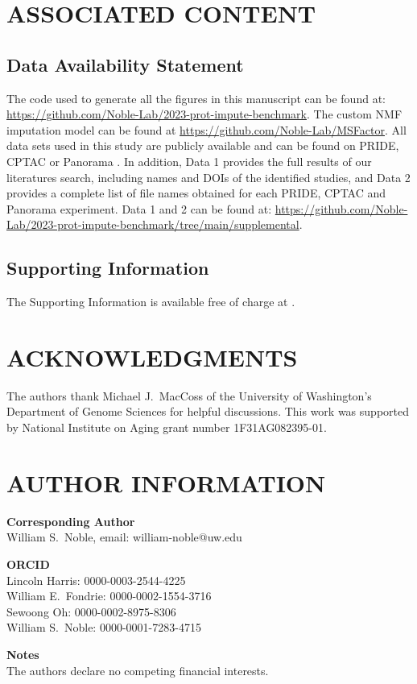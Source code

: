 \documentclass{article}
\newcommand{\fixme}[1]{{\color{red}{#1}}}
\begin{document}
\section*{ASSOCIATED CONTENT}
\subsection*{Data Availability Statement}
The code used to generate all the figures in this manuscript can be found at:
\url{https://github.com/Noble-Lab/2023-prot-impute-benchmark}. The custom NMF imputation model can be found at \url{https://github.com/Noble-Lab/MSFactor}. All data sets used in this study are publicly available and can be found on PRIDE, CPTAC or Panorama \cite{PRIDE, CPTAC, panorama-public}. In addition, Data 1 provides the full results of our literatures search, including names and DOIs of the identified studies, and Data 2 provides a complete list of file names obtained for each PRIDE, CPTAC and Panorama experiment. Data 1 and 2 can be found at:
\url{https://github.com/Noble-Lab/2023-prot-impute-benchmark/tree/main/supplemental}.

\subsection*{Supporting Information}
The Supporting Information is available free of charge at \fixme{xxx}.

\section*{ACKNOWLEDGMENTS}
The authors thank Michael J.\ MacCoss of the University of Washington's Department of Genome Sciences for helpful discussions. This work was supported by National Institute on Aging grant number 1F31AG082395-01.

\section*{AUTHOR INFORMATION}
\textbf{Corresponding Author} \\
William S.\ Noble, email: william-noble@uw.edu

\textbf{ORCID} \\
Lincoln Harris: 0000-0003-2544-4225 \\
William E.\ Fondrie: 0000-0002-1554-3716 \\
Sewoong Oh: 0000-0002-8975-8306 \\
William S.\ Noble: 0000-0001-7283-4715

\textbf{Notes} \\
The authors declare no competing financial interests.


 
\end{document}
